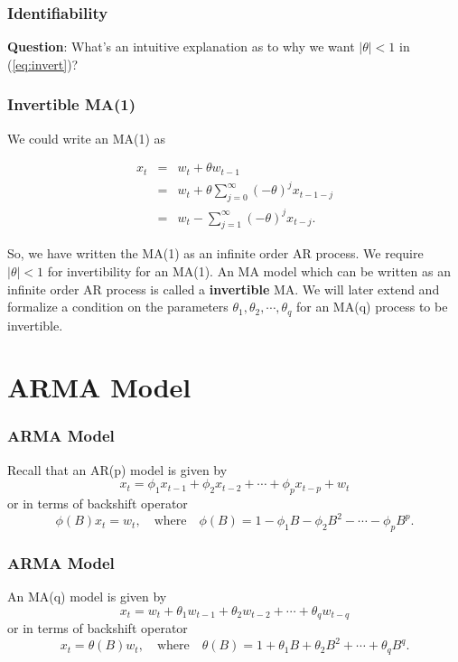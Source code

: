\documentclass[%
xcolor=pdftex]{beamer}
\begin{document}
\begin{frame}
\frametitle{Identifiability}

\textbf{Question}: What's an intuitive explanation as to why we want $|\theta|<1$ in (\ref{eq:invert})?

\vspace{60mm}

\end{frame}


\begin{frame}
\frametitle{Invertible MA(1)}

We could write an MA(1) as

\begin{eqnarray*}
 x_t &=& w_t + \theta w_{t-1} \\
     &=& w_t +\theta \sum_{j=0}^\infty (-\theta)^j x_{t-1-j}\\
     &=&  w_t - \sum_{j=1}^\infty (-\theta)^j x_{t-j}.
\end{eqnarray*}

 So, we have written the MA(1) as an infinite order AR process. We require $|\theta|<1$ for invertibility for an MA(1). An MA model which can be written as an infinite order AR process is called a \textbf{invertible} MA.  We will later extend and formalize a condition on the parameters $\theta_1, \theta_2, \cdots, \theta_q$ for an MA(q) process to be invertible.


\end{frame}



\section{ARMA Model}
\frame{\tableofcontents[currentsection]}

\begin{frame}
\frametitle{ARMA Model}

Recall that an AR(p) model is given by
 $$
 x_t=\phi_1 x_{t-1} +\phi_2 x_{t-2} + \cdots + \phi_p x_{t-p} + w_t
 $$
 or in terms of backshift operator
 $$
\phi(B) x_t =w_t, \quad \mbox{where} \quad \phi(B)=1-\phi_1 B-\phi_2 B^2-\cdots-\phi_p B^p.
$$

\end{frame}

\begin{frame}
\frametitle{ARMA Model}

An MA(q) model is given by
$$
x_t = w_t + \theta_1 w_{t-1} + \theta_2 w_{t-2} + \cdots + \theta_q w_{t-q}
$$
or in terms of backshift operator
$$
x_t =  \theta(B)w_t, \quad \mbox{where} \quad \theta(B)=1+\theta_1 B+\theta_2 B^2 +\cdots + \theta_q B^q.
$$

\end{frame}
\end{document}
